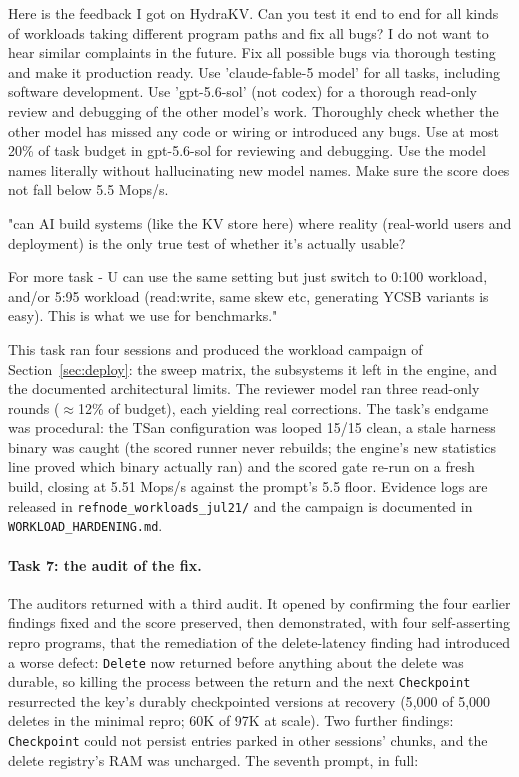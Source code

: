 \documentclass{article}
\newenvironment{promptbox}{\begin{mdframed}[linewidth=0.4pt,linecolor=black,innerleftmargin=5pt,innerrightmargin=5pt,innertopmargin=5pt,innerbottommargin=5pt,skipabove=2pt,skipbelow=5pt]\setlength{\parskip}{0pt}\setlength{\parindent}{0pt}\ttfamily\scriptsize\raggedright\frenchspacing\obeylines\leavevmode\strut\ignorespaces}{\end{mdframed}}
\newcommand{\HydraHardenedWL}{5.51}     %
\begin{document}
\begin{promptbox}
Here is the feedback I got on HydraKV.  Can you test it end to end for all kinds of workloads taking different program paths and fix all bugs?  I do not want to hear similar complaints in the future.  Fix all possible bugs via thorough testing and make it production ready.  Use 'claude-fable-5 model' for all tasks, including software development. Use 'gpt-5.6-sol' (not codex) for a thorough read-only review and debugging of the other model's work. Thoroughly check whether the other model has missed any code or wiring or introduced any bugs. Use at most 20\% of task budget in gpt-5.6-sol for reviewing and debugging. Use the model names literally without hallucinating new model names.  Make sure the score does not fall below 5.5 Mops/s.
\strut
"can AI build systems (like the KV store here) where reality (real-world users and deployment) is the only true test of whether it's actually usable?
\strut
For more task - U can use the same setting but just switch to 0:100 workload, and/or 5:95 workload (read:write, same skew etc, generating YCSB variants is easy). This is what we use for benchmarks."
\end{promptbox}

This task ran four sessions and produced the workload campaign of Section~\ref{sec:deploy}: the sweep matrix, the subsystems it left in the engine, and the documented architectural limits. The reviewer model ran three read-only rounds ($\approx$12\% of budget), each yielding real corrections. The task's endgame was procedural: the TSan configuration was looped 15/15 clean, a stale harness binary was caught (the scored runner never rebuilds; the engine's new statistics line proved which binary actually ran) and the scored gate re-run on a fresh build, closing at \HydraHardenedWL{} Mops/s against the prompt's 5.5 floor. Evidence logs are released in \texttt{refnode\_workloads\_jul21/} and the campaign is documented in \texttt{WORKLOAD\_HARDENING.md}.

\paragraph{Task 7: the audit of the fix.}
The auditors returned with a third audit. It opened by confirming the four earlier findings fixed and the score preserved, then demonstrated, with four self-asserting repro programs, that the remediation of the delete-latency finding had introduced a worse defect: \texttt{Delete} now returned before anything about the delete was durable, so killing the process between the return and the next \texttt{Checkpoint} resurrected the key's durably checkpointed versions at recovery (5{,}000 of 5{,}000 deletes in the minimal repro; 60K of 97K at scale). Two further findings: \texttt{Checkpoint} could not persist entries parked in other sessions' chunks, and the delete registry's RAM was uncharged. The seventh prompt, in full:
\end{document}
